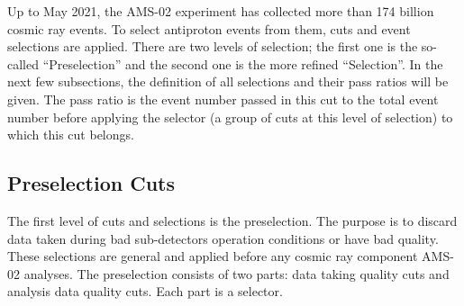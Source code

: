 


Up to May 2021, the AMS-02 experiment has collected more than 174 billion cosmic ray events. To select antiproton events from them, cuts and event selections are applied. There are two levels of selection; the first one is the so-called “Preselection” and the second one is the more refined “Selection”. In the next few subsections, the definition of all selections and their pass ratios will be given. The pass ratio is the event number passed in this cut to the total event number before applying the selector (a group of cuts at this level of selection) to which this cut belongs. \par 

\subsection{Preselection Cuts}
The first level of cuts and selections is the preselection. The purpose is to discard data taken during bad sub-detectors operation conditions or have bad quality. These selections are general and applied before any cosmic ray component AMS-02 analyses. The preselection consists of two parts: data taking quality cuts and analysis data quality cuts. Each part is a selector. \par 

